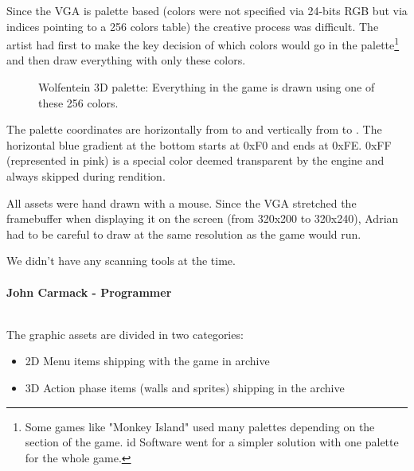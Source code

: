 \documentclass[book.tex]{subfiles}
\begin{document}
\par
Since the VGA is palette based (colors were not specified via 24-bits RGB but via indices pointing to a 256 colors table) the creative process was difficult. The artist had first to make the key decision of which colors would go in the palette\footnote{Some games like "Monkey Island" used many palettes depending on the section of the game. id Software went for a simpler solution with one palette for the whole game.} and then draw everything with only these colors.\\
\begin{figure}[H]
  \centering
{}
 \caption{Wolfentein 3D palette: Everything in the game is drawn using one of these 256 colors.}
\end{figure}
The palette coordinates are horizontally from  to  and vertically from  to . The horizontal blue gradient at the bottom starts at 0xF0 and ends at 0xFE. 0xFF (represented in pink) is a special color deemed transparent by the engine and always skipped during rendition.\\
\par

All assets were hand drawn with a mouse. Since the VGA stretched the framebuffer when displaying it on the screen (from 320x200 to 320x240), Adrian had to be careful to draw at the same resolution as the game would run.\\
\par
\begin{fancyquotes}
We didn't have any scanning tools at the time.\\
\\
\textbf{John Carmack - Programmer}
\end{fancyquotes}
\\
The graphic assets are divided in two categories:
\begin{itemize}
\item 2D Menu items shipping with the game in  archive
\item 3D Action phase items (walls and sprites) shipping in the  archive
\end{itemize}
\end{document}
